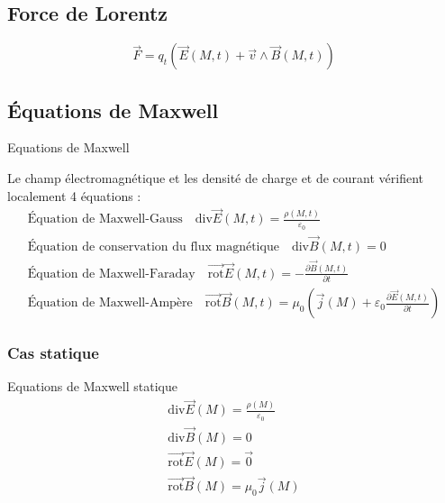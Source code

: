 \subsection{Force de Lorentz} %
\label{sub:Force de Lorentz}
\begin{equation}
  \overrightarrow{F} = q_t ( \overrightarrow{E} (M,t) + \overrightarrow{v} \wedge \overrightarrow{B}(M,t))
\end{equation}

\subsection{Équations de Maxwell} %
\label{sub:Équations de Maxwell}

\begin{Theorem}{Equations de Maxwell}{}

  Le champ électromagnétique et les densité de charge et de courant vérifient localement 4 équations : 
\begin{gather}
  \text{Équation de Maxwell-Gauss} \quad \mathrm{div} \overrightarrow{E} (M,t) = \frac{\rho(M,t)}{\varepsilon_0}  \\ 
\text{Équation de conservation du flux magnétique} \quad  \mathrm{div} \overrightarrow{B} (M,t) = 0 \\ 
\text{Équation de Maxwell-Faraday} \quad   \overrightarrow{\mathrm{rot}} \overrightarrow{E}(M,t ) = - \frac{\partial \overrightarrow{B}(M,t)}{\partial t}  \\ 
\text{Équation de Maxwell-Ampère} \quad \overrightarrow{\mathrm{rot}} \overrightarrow{B}(M,t ) = \mu_0 \left(\overrightarrow{j}(M) + \varepsilon_0 \frac{\partial \overrightarrow{E}(M,t)}{\partial t} \right)
\end{gather}
\end{Theorem}


\subsubsection{Cas statique} %
\label{sec:Cas statique}

\begin{Prop}{Equations de Maxwell statique}{}
\begin{gather}
  \mathrm{div} \overrightarrow{E} (M) = \frac{\rho(M)}{\varepsilon_0}  \\ 
  \mathrm{div} \overrightarrow{B} (M) = 0 \\ 
  \overrightarrow{\mathrm{rot}} \overrightarrow{E}(M) = \overrightarrow{0} \\ 
  \overrightarrow{\mathrm{rot}} \overrightarrow{B}(M) = \mu_0 \overrightarrow{j}(M)
\end{gather}
\end{Prop}

